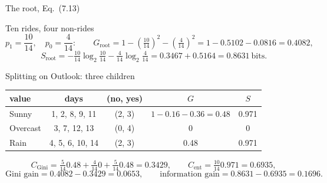 \documentclass[10pt,aspectratio=169]{beamer}
\begin{document}
\begin{frame}{The root, Eq.\ (7.13)}
\small
\begin{block}{Ten rides, four non-rides}
\[
  p_{1}=\frac{10}{14},\quad p_{0}=\frac{4}{14}:\qquad
  G_{\mathrm{root}}=1-\left(\tfrac{10}{14}\right)^2-\left(\tfrac{4}{14}\right)^2
  =1-0.5102-0.0816=\mathbf{0.4082},
\]
\[
  S_{\mathrm{root}}=-\tfrac{10}{14}\log_2\tfrac{10}{14}-\tfrac{4}{14}\log_2\tfrac{4}{14}
  =0.3467+0.5164=\mathbf{0.8631}\ \text{bits}.
\]
\end{block}
\begin{block}{Splitting on Outlook: three children}
\centering
\begin{tabular}{lcccc}\toprule
value & days & (no, yes) & $G$ & $S$\\\midrule
Sunny & 1, 2, 8, 9, 11 & (2, 3) & $1-0.16-0.36=0.48$ & 0.971\\
Overcast & 3, 7, 12, 13 & (0, 4) & 0 & 0\\
Rain & 4, 5, 6, 10, 14 & (2, 3) & 0.48 & 0.971\\\bottomrule
\end{tabular}
\[
  C_{\mathrm{Gini}}=\tfrac{5}{14}0.48+\tfrac{4}{14}0+\tfrac{5}{14}0.48=\mathbf{0.3429},
  \qquad
  C_{\mathrm{ent}}=\tfrac{10}{14}0.971=\mathbf{0.6935},
\]
\[
  \text{Gini gain}=0.4082-0.3429=\mathbf{0.0653},\qquad
  \text{information gain}=0.8631-0.6935=\mathbf{0.1696}.
\]
\end{block}
\end{frame}
\end{document}
